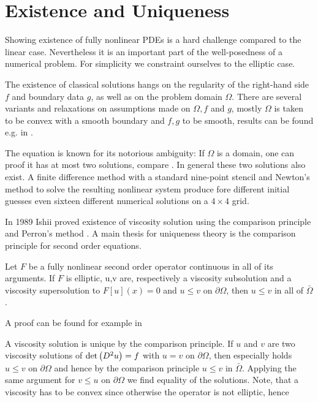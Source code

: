 \section{Existence and Uniqueness}
Showing existence of fully nonlinear PDEs is a hard challenge compared to the linear case. Nevertheless it is an important part of the well-posedness of a numerical problem. 
For simplicity we constraint ourselves to the elliptic case. 

The existence of classical solutions hangs on the regularity of the right-hand side $f$ and boundary data $g$, as well as on the problem domain $\Omega$. There are several variants and relaxations on assumptions made on $\Omega,f$ and $g$, mostly $\Omega$ is taken to be convex with a smooth boundary and $f,g$ to be smooth, results can be found e.g. in \cite{Gutierrez2001, GT1983, Urbas1998}.

The \MA equation is known for its notorious ambiguity: If $\Omega$ is a domain, one can proof it has at most two solutions, compare \cite[Kap.IV, \S 5,3]{CH1968}. In general these two solutions also exist.
A finite difference method with a standard nine-point stencil and Newton's method to solve the resulting nonlinear system produce fore different initial guesses even sixteen different numerical solutions on a $4 \times 4$ grid\cite{FGN2013}. 

In 1989 Ishii proved existence of viscosity solution using the comparison principle and Perron's method \cite{Ishii1989}. 
A main thesis for uniqueness theory is the comparison principle for second order equations.

\begin{theorem}
	Let $F$ be a fully nonlinear second order operator continuous in all of its arguments.
	If $F$ is elliptic,	u,v are, respectively a viscosity subsolution and a viscosity supersolution to $F[u](x)=0$ and $u \leq v$ on $\partial \Omega$, then $u \leq v$ in all of $\bar \Omega$.
\end{theorem}
A proof can be found for example in \cite[Theorem 17.1]{GT1983}

A viscosity solution is unique by the comparison principle. If $u$ and $v$ are two viscosity solutions of $\det{\left(D^2 u\right)}=f$ with $u=v$ on $\partial \Omega$, then especially holds $u \leq v$ on $\partial \Omega$ and hence by the comparison principle $u \leq v$ in  $\bar \Omega$. Applying the same argument for $v \leq u$ on $\partial \Omega$ we find equality of the solutions. Note, that a viscosity has to be convex since otherwise the \MA operator is not elliptic, hence  

